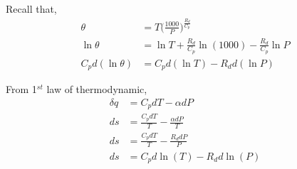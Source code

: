 \documentclass[fleqn,10pt]{SelfArx} %
\begin{document}
%
%
%
%

Recall that,
\begin{align}
    \theta &= T\Big(\frac{1000}{P}\Big)^{\frac{R_d}{C_p}} \\
    \ln \theta &= \ln T + \frac{R_d}{C_p}\ln(1000) - \frac{R_d}{C_p}\ln P \\ 
    C_p d(\ln \theta) &= C_p d(\ln T) - R_d d(\ln P) \label{eq:2ndLaw1}
\end{align}

From 1$^{st}$ law of thermodynamic,
\begin{align}
    \delta q &= C_p dT - \alpha dP \\
    ds &= \frac{C_p dT}{T} - \frac{\alpha dP}{T} \\
    ds &= \frac{C_p dT}{T} - \frac{R_d dP}{P} \\
    ds &= C_p d\ln(T) - R_d d\ln(P) \label{eq:2ndLaw2}
\end{align}
\end{document}
